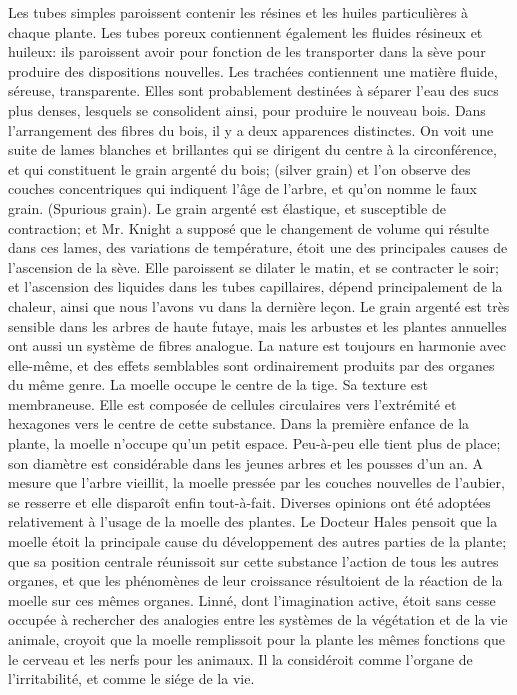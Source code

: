 Les tubes simples paroissent contenir les résines et les huiles particulières à chaque plante.
Les tubes poreux contiennent également les fluides résineux et huileux: ils paroissent avoir pour fonction de les transporter dans la sève pour produire des dispositions nouvelles.
Les trachées contiennent une matière fluide, séreuse, transparente. Elles sont probablement destinées à séparer l'eau des sucs plus denses, lesquels se consolident ainsi, pour produire le nouveau bois.
Dans l'arrangement des fibres du bois, il y a deux apparences distinctes. On voit une suite de lames blanches et brillantes qui se dirigent du centre à la circonférence, et qui constituent le grain argenté du bois; (silver grain) et l'on observe des couches concentriques qui indiquent l'âge de l'arbre, et qu'on nomme le faux grain. (Spurious grain).
Le grain argenté est élastique, et susceptible de contraction; et Mr. Knight a supposé que le changement de volume qui résulte dans ces lames, des variations de température, étoit une des principales causes de l'ascension de la sève. Elle paroissent se\setcounter{page}{380} dilater le matin, et se contracter le soir; et l'ascension des liquides dans les tubes capillaires, dépend principalement de la chaleur, ainsi que nous l'avons vu dans la dernière leçon.
Le grain argenté est très sensible dans les arbres de haute futaye, mais les arbustes et les plantes annuelles ont aussi un système de fibres analogue. La nature est toujours en harmonie avec elle-même, et des effets semblables sont ordinairement produits par des organes du même genre.
La moelle occupe le centre de la tige. Sa texture est membraneuse. Elle est composée de cellules circulaires vers l'extrémité et hexagones vers le centre de cette substance.
Dans la première enfance de la plante, la moelle n'occupe qu'un petit espace. Peu-à-peu elle tient plus de place; son diamètre est considérable dans les jeunes arbres et les pousses d'un an. A mesure que l'arbre vieillit, la moelle pressée par les couches nouvelles de l'aubier, se resserre et elle disparoît enfin tout-à-fait.
Diverses opinions ont été adoptées relativement à l'usage de la moelle des plantes. Le Docteur Hales pensoit que la moelle étoit la principale cause du développement des autres parties de la plante; que sa position\setcounter{page}{381} centrale réunissoit sur cette substance l'action de tous les autres organes, et que les phénomènes de leur croissance résultoient de la réaction de la moelle sur ces mêmes organes.
Linné, dont l'imagination active, étoit sans cesse occupée à rechercher des analogies entre les systèmes de la végétation et de la vie animale, croyoit que la moelle remplissoit pour la plante les mêmes fonctions que le cerveau et les nerfs pour les animaux. Il la considéroit comme l'organe de l'irritabilité, et comme le siége de la vie.
